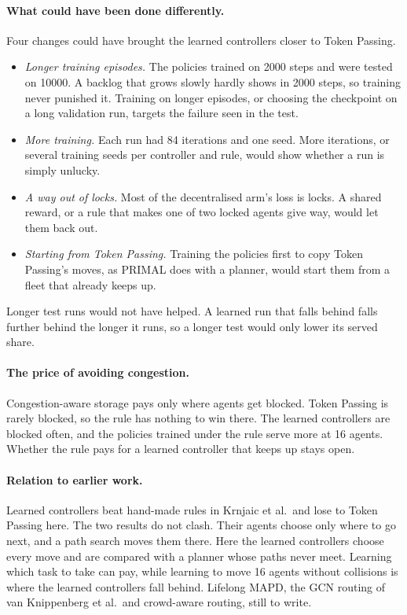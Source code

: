 \documentclass[11pt,a4paper]{article}
\begin{document}
\paragraph{What could have been done differently.}
Four changes could have brought the learned controllers closer to Token Passing.
\begin{itemize}[leftmargin=1.2em]
  \item \emph{Longer training episodes.} The policies trained on 2000 steps and were tested on
    10000. A backlog that grows slowly hardly shows in 2000 steps, so training never punished it.
    Training on longer episodes, or choosing the checkpoint on a long validation run, targets the
    failure seen in the test.
  \item \emph{More training.} Each run had 84 iterations and one seed. More iterations, or several
    training seeds per controller and rule, would show whether a run is simply unlucky.
  \item \emph{A way out of locks.} Most of the decentralised arm's loss is locks. A shared reward,
    or a rule that makes one of two locked agents give way, would let them back out.
  \item \emph{Starting from Token Passing.} Training the policies first to copy Token Passing's moves,
    as PRIMAL does with a planner, would start them from a fleet that already keeps up.
\end{itemize}
Longer test runs would not have helped. A learned run that falls behind falls further behind the
longer it runs, so a longer test would only lower its served share.

\paragraph{The price of avoiding congestion.}
Congestion-aware storage pays only where agents get blocked. Token Passing is rarely blocked, so the
rule has nothing to win there. The learned controllers are blocked often, and the policies trained
under the rule serve more at 16 agents. Whether the rule pays for a learned controller that keeps up
stays open.

\paragraph{Relation to earlier work.}
Learned controllers beat hand-made rules in Krnjaic et al.\ and lose to Token Passing here. The two
results do not clash. Their agents choose only where to go next, and a path search moves them there.
Here the learned controllers choose every move and are compared with a planner whose paths never
meet. Learning which task to take can pay, while learning to move 16 agents without collisions is
where the learned controllers fall behind. Lifelong MAPD, the GCN routing of van Knippenberg et al.\
and crowd-aware routing, still to write.
\end{document}
